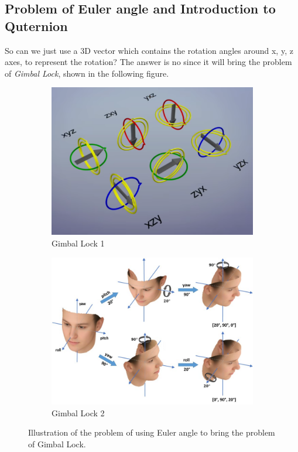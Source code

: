 \documentclass{article}
\begin{document}
\subsection{Problem of Euler angle and Introduction to Quternion}
So can we just use a 3D vector which contains the rotation angles around x, y, z axes, to represent the rotation? The answer is no since it will bring the problem of \textit{Gimbal Lock}, shown in the following figure.
\begin{figure}[h]
    \centering
    \begin{subfigure}{0.45\textwidth}
        \centering
        \includegraphics[width=\textwidth]{figs/gimbal_lock_1.png}
        \caption{Gimbal Lock 1}
    \end{subfigure}
    \hfill
    \begin{subfigure}{0.45\textwidth}
        \centering
        \includegraphics[width=\textwidth]{figs/gimbal_lock_2.png}
        \caption{Gimbal Lock 2}
    \end{subfigure}
    \caption{Illustration of the problem of using Euler angle to bring the problem of Gimbal Lock.}
    \label{fig:quaternion}
\end{figure}
\end{document}

